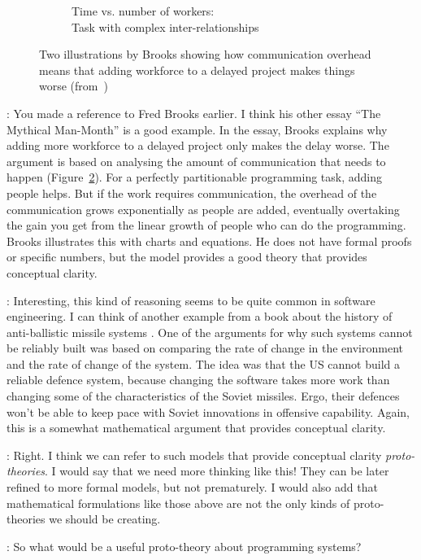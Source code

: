 \documentclass[runningheads]{llncs}
\newcommand{\T}{Tomas}
\newcommand{\J}{Joel}
\newcommand{\says}[2][gg]{\vspace{0.5em}\noindent\hangindent=0.5cm{\textsc{#1}}: #2}
\begin{document}
\begin{figure}[t]
\begin{subfigure}{0.49\textwidth}
   \caption{Time vs. number of workers:\\Task with complex inter-relationships}
   \label{fig:syy}
\end{subfigure}
\caption{Two illustrations by Brooks showing how communication overhead means that adding workforce to a delayed project makes things worse (from~\cite{brooks-1975-manmonth})}
\label{fig:mm}
\vspace{-0.5em}
\end{figure}

\says[\J]{You made a reference to Fred Brooks earlier. I think his other essay ``The Mythical Man-Month'' \cite{brooks-1975-manmonth} is a good example. In the essay, Brooks explains why adding more workforce to a delayed project only makes the delay worse. The argument is based on analysing the amount of communication that needs to happen (Figure~\ref{fig:mm}). For a perfectly partitionable programming task, adding people helps. But if the work requires communication, the overhead of the communication grows exponentially as people are added, eventually overtaking the gain you get from the linear growth of people who can do the programming. Brooks illustrates this with charts and equations. He does not have formal proofs or specific numbers, but the model provides a good theory that provides conceptual clarity.}

\says[\T]{Interesting, this kind of reasoning seems to be quite common in software engineering. I can think of another example from a book about the history of anti-ballistic missile systems \cite{slayton-2013-arguments}. One of the arguments for why such systems cannot be reliably built was based on comparing the rate of change in the environment and the rate of change of the system. The idea was that the US cannot build a reliable defence system, because changing the software takes more work than changing some of the characteristics of the Soviet missiles. Ergo, their defences won't be able to keep pace with Soviet innovations in offensive capability. Again, this is a somewhat mathematical argument that provides conceptual clarity.}

\says[\J]{Right. I think we can refer to such models that provide conceptual clarity \emph{proto-theories}. I would say that we need more thinking like this! They can be later refined to more formal models, but not prematurely. I would also add that mathematical formulations like those above are not the only kinds of proto-theories we should be creating.}

\says[\T]{So what would be a useful proto-theory about programming systems?}
\end{document}
